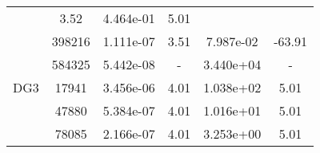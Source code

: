 \begin{table}
\begin{center}
{\begin{tabular}{| l | c | c | c | c | c |}
                &3.52
                
                &4.464e-01
                
                &5.01\\
                
            &398216
            
                &1.111e-07
                
                &3.51
                
                &7.987e-02
                
                &-63.91\\
                
            &584325
            
                &5.442e-08
                
                &-
                
                &3.440e+04
                
                &-\\
                \hline
        \hline
        \hspace{0.1cm}DG3\hspace{0.1cm}    
        
            &17941
            
                &3.456e-06
                
                &4.01
                
                &1.038e+02
                
                &5.01\\
                
            &47880
            
                &5.384e-07
                
                &4.01
                
                &1.016e+01
                
                &5.01\\
                
            &78085
            
                &2.166e-07
                
                &4.01
                
                &3.253e+00
                
                &5.01\\
                

\end{tabular}}
\end{center}
\end{table}
